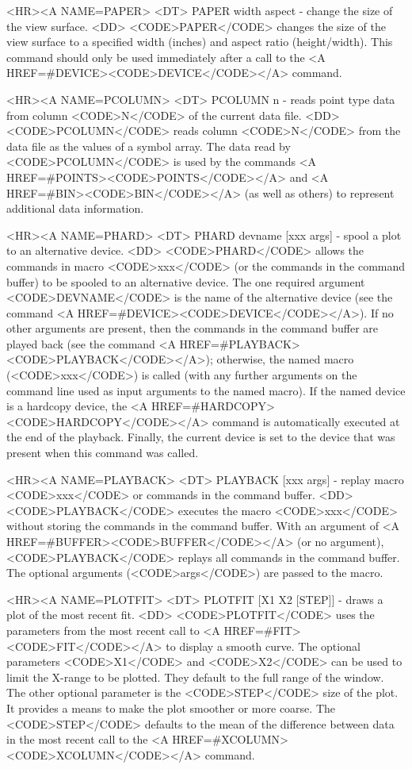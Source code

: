 \begin{rawhtml}
<HR><A NAME=PAPER>
<DT>
PAPER width aspect - change the size of the view surface.
<DD>
	<CODE>PAPER</CODE> changes the size of the view surface to a
	specified width (inches) and aspect ratio (height/width).  This
	command should only be used immediately after a call to the
	<A HREF=#DEVICE><CODE>DEVICE</CODE></A> command.

<HR><A NAME=PCOLUMN>
<DT>
PCOLUMN n - reads point type data from column <CODE>N</CODE> of the current data file.
<DD>
	<CODE>PCOLUMN</CODE> reads column <CODE>N</CODE> from the data
	file as the values of a symbol array.  The data read by
	<CODE>PCOLUMN</CODE> is used by the commands
	<A HREF=#POINTS><CODE>POINTS</CODE></A> and
	<A HREF=#BIN><CODE>BIN</CODE></A> (as well as others) to
	represent additional data information.

<HR><A NAME=PHARD>
<DT>
PHARD devname [xxx args] - spool a plot to an alternative device.
<DD>
	<CODE>PHARD</CODE> allows the commands in macro <CODE>xxx</CODE>
	(or the commands in the command buffer) to be spooled to an
	alternative device.  The one required argument <CODE>DEVNAME</CODE>
	is the name of the alternative device (see the command
	<A HREF=#DEVICE><CODE>DEVICE</CODE></A>).  If no other
	arguments are present, then the commands in the command buffer
	are played back (see the command
	<A HREF=#PLAYBACK><CODE>PLAYBACK</CODE></A>);
	otherwise, the named macro (<CODE>xxx</CODE>) is called (with
	any further arguments on the command line used as input arguments
	to the named macro).  If the named device is a hardcopy device, the
	<A HREF=#HARDCOPY><CODE>HARDCOPY</CODE></A> command is automatically
	executed at the end of the playback.  Finally, the current device
	is set to the device that was present when this command was called.

<HR><A NAME=PLAYBACK>
<DT>
PLAYBACK [xxx args] - replay macro <CODE>xxx</CODE> or commands in the command buffer.
<DD>
	<CODE>PLAYBACK</CODE> executes the macro <CODE>xxx</CODE> without
	storing the commands in the command buffer.  With an argument of
	<A HREF=#BUFFER><CODE>BUFFER</CODE></A> (or no argument),
	<CODE>PLAYBACK</CODE> replays all commands in the command buffer.
	The optional arguments (<CODE>args</CODE>) are passed to the macro.

<HR><A NAME=PLOTFIT>
<DT>
PLOTFIT [X1 X2 [STEP]] - draws a plot of the most recent fit.
<DD>
	<CODE>PLOTFIT</CODE> uses the parameters from the most recent
	call to <A HREF=#FIT><CODE>FIT</CODE></A> to display a smooth
	curve.  The optional parameters <CODE>X1</CODE> and <CODE>X2</CODE>
	can be used to limit the X-range to be plotted.  They default to
	the full range of the window.  The other optional parameter is
	the <CODE>STEP</CODE> size of the plot.  It provides a means to
	make the plot smoother or more coarse.  The <CODE>STEP</CODE>
	defaults to the mean of the difference between data in the
	most recent call to the <A HREF=#XCOLUMN><CODE>XCOLUMN</CODE></A>
	command.


\end{rawhtml}
